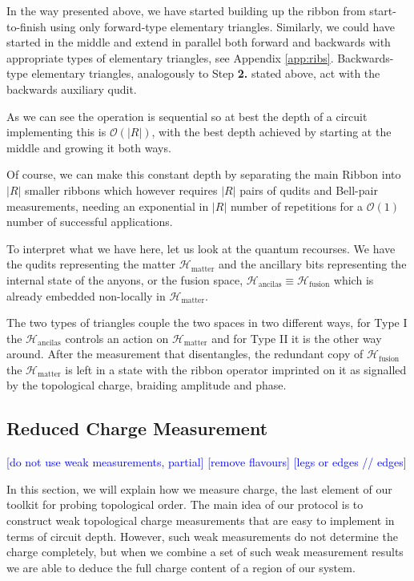 \documentclass[two column]{article}
\newcommand{\caro}[1]{\textcolor{red}{[#1]}}
\newcommand{\jovan}[1]{\textcolor{blue}{[#1]}}
\begin{document}
In the way presented above, we have started building up the ribbon from start-to-finish using only forward-type elementary triangles. Similarly, we could have started in the middle and extend in parallel both forward and backwards with appropriate types of elementary triangles, see Appendix \ref{app:ribs}. Backwards-type elementary triangles, analogously to Step \textbf{2.} stated above, act with the backwards auxiliary qudit.

As we can see the operation is sequential so at best the depth of a circuit implementing this is $\mathcal{O}(|R|)$, with the best depth achieved by starting at the middle and growing it both ways.

Of course, we can make this constant depth by separating the main Ribbon into $|R|$ smaller ribbons which however requires $|R|$ pairs of qudits and Bell-pair measurements, needing an exponential  in $|R|$ number of repetitions for a $\mathcal{O}(1)$ number of successful applications.

To interpret what we have here, let us look at the quantum recourses. We have the qudits representing the matter $\mathcal{H}_{\text{matter}}$ and the ancillary bits representing the internal state of the anyons, or the fusion space, $\mathcal{H}_{\text{ancilas}} \equiv \mathcal{H}_{\text{fusion}}$ which is already embedded non-locally in  $\mathcal{H}_{\text{matter}}$.

The two types of triangles couple the two spaces in two different ways, for Type I the $\mathcal{H}_{\text{ancilas}}$ controls an action on $\mathcal{H}_{\text{matter}}$ and for Type II it is the other way around. After the measurement that disentangles, the redundant copy of $\mathcal{H}_{\text{fusion}}$ the $\mathcal{H}_{\text{matter}}$ is left in a state with the ribbon operator imprinted on it as signalled by the topological charge, braiding amplitude and phase.

\subsection{Reduced Charge Measurement}

\jovan{do not use weak measurements, partial}
\jovan{remove flavours}
\jovan{legs or edges // edges}

In this section, we will explain how we measure charge, the last element of our toolkit for probing topological order. The main idea of our protocol is to construct weak topological charge measurements that are easy to implement in terms of circuit depth. However, such weak measurements do not determine the charge completely, but when we combine a set of such weak measurement results we are able to deduce the full charge content of a region of our system.
\end{document}
